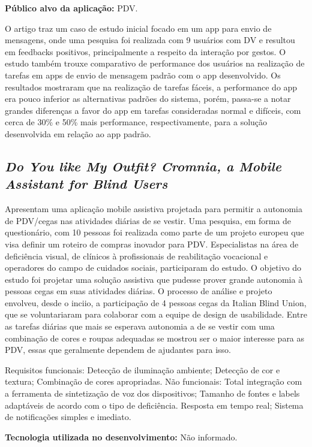 \textbf{Público alvo da aplicação:} PDV\@.

O artigo traz um caso de estudo inicial focado em um app para envio de mensagens, onde uma pesquisa foi realizada com 9 usuários com DV e resultou em feedbacks positivos, principalmente a respeito da interação por gestos.
O estudo também trouxe comparativo de performance dos usuários na realização de tarefas em apps de envio de mensagem padrão com o app desenvolvido.
Os resultados mostraram que na realização de tarefas fáceis, a performance do app era pouco inferior as alternativas padrões do sistema, porém, passa-se a notar grandes diferenças a favor do app em tarefas consideradas normal e difíceis, com cerca de 30\% e 50\% mais performance, respectivamente, para a solução desenvolvida em relação ao app padrão.

\subsection{\emph{Do You like My Outfit? Cromnia, a Mobile Assistant for Blind Users}}

Apresentam uma aplicação mobile assistiva projetada para permitir a autonomia de PDV/cegas nas atividades diárias de se vestir.
Uma pesquisa, em forma de questionário, com 10 pessoas foi realizada como parte de um projeto europeu que visa definir um roteiro de compras inovador para PDV\@.
Especialistas na área de deficiência visual, de clínicos à profissionais de reabilitação vocacional e operadores do campo de cuidados sociais, participaram do estudo.
O objetivo do estudo foi projetar uma solução assistiva que pudesse prover grande autonomia à pessoas cegas em suas atividades diárias.
O processo de análise e projeto envolveu, desde o inciio, a participação de 4 pessoas cegas da Italian Blind Union, que se voluntariaram para colaborar com a equipe de design de usabilidade.
Entre as tarefas diárias que mais se esperava autonomia a de se vestir com uma combinação de cores e roupas adequadas se mostrou ser o maior interesse para as PDV, essas que geralmente dependem de ajudantes para isso.

Requisitos funcionais:
Detecção de iluminação ambiente;
Detecção de cor e textura;
Combinação de cores apropriadas.
Não funcionais:
Total integração com a ferramenta de sintetização de voz dos dispositivos;
Tamanho de fontes e labels adaptáveis de acordo com o tipo de deficiência.
Resposta em tempo real;
Sistema de notificações simples e imediato.

\textbf{Tecnologia utilizada no desenvolvimento:} Não informado.

